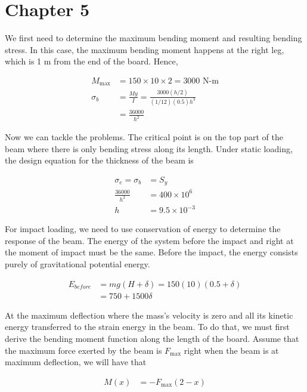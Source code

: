 \documentclass[
10pt,
a4paper,
openany,
svgnames,
]{book}
\begin{document}
\section{Chapter 5}

\begin{exercises}
\item We first need to determine the maximum bending moment and resulting bending stress. In this case, the maximum bending moment happens at the right leg, which is 1 m from the end of the board. Hence,

  \begin{align*}
    M_{\max} &= 150 \times 10 \times 2 = 3000 \text{ N-m} \\
    \sigma_{b} &= \frac{My}{I} = \frac{3000(h/2)}{(1/12)(0.5)h^3 } \\
             &= \frac{36000}{h^2}
  \end{align*}

  Now we can tackle the problems. The critical point is on the top part of the beam where there is only bending stress along its length. Under static loading, the design equation for the thickness of the beam is

  \begin{align*}
    \sigma_e = \sigma_b &= S_y \\
    \frac{36000}{h^2} &= 400 \times 10^6 \\
    h &= 9.5 \times 10^{-3}
  \end{align*}

  For impact loading, we need to use conservation of energy to determine the response of the beam. The energy of the system before the impact and right at the moment of impact must be the same. Before the impact, the energy consists purely of gravitational potential energy.

  \begin{align*}
    E_{before} &= mg(H+\delta) = 150(10)(0.5+\delta) \\
               &= 750 + 1500 \delta
  \end{align*}

  At the maximum deflection where the mass's velocity is zero and all its kinetic energy transferred to the strain energy in the beam. To do that, we must first derive the bending moment function along the length of the board. Assume that the maximum force exerted by the beam is $F_{\max}$ right when the beam is at maximum deflection, we will have that

  \begin{align*}
    M(x) &= -F_{\max}(2 - x)
  \end{align*}


\end{exercises}
\end{document}
